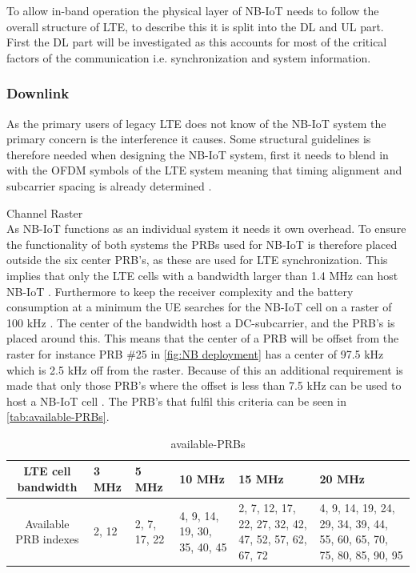 To allow in-band operation the physical layer of \gls{NB-IoT} needs to follow the overall structure of \gls{LTE}, to describe this it is split into the \gls{DL} and \gls{UL} part. First the \gls{DL} part will be investigated as this accounts for most of the critical factors of the communication i.e. synchronization and system information. 

\subsubsection{Downlink}
As the primary users of legacy \gls{LTE} does not know of the \gls{NB-IoT} system the primary concern is the interference it causes. Some structural guidelines is therefore needed when designing the \gls{NB-IoT} system, first it needs to blend in with the \gls{OFDM} symbols of the \gls{LTE} system meaning that timing alignment and subcarrier spacing is already determined \citep[ch. 7.2]{NB-IoT_Book}. 

Channel Raster\\
As \gls{NB-IoT} functions as an individual system it needs it own overhead. To ensure the functionality of both systems the \gls{PRB}s used for \gls{NB-IoT} is therefore placed outside the six center \gls{PRB}'s, as these are used for LTE synchronization. This implies that only the LTE cells with a bandwidth larger than 1.4 MHz can host NB-IoT \citep{whitepaper}. Furthermore to keep the receiver complexity and the battery consumption at a minimum the \gls{UE} searches for the \gls{NB-IoT} cell on a raster of 100 kHz \citep[ch. 7.2]{NB-IoT_Book}. The center of the bandwidth host a DC-subcarrier, and the \gls{PRB}'s is placed around this. This means that the center of a PRB will be offset from the raster for instance PRB \#25 in \autoref{fig:NB deployment} has a center of 97.5 kHz which is 2.5 kHz off from the raster. Because of this an additional requirement is made that only those \gls{PRB}'s where the offset is less than 7.5 kHz can be used to host a NB-IoT cell \citep{primer}. The PRB's that fulfil this criteria can be seen in \autoref{tab:available-PRBs}. 

\begin{table}[H]
\centering
\begin{tabular}{|c|p{1.8cm}|p{1.8cm}|p{1.8cm}|p{1.8cm}|p{1.8cm}|}\hline
\textbf{LTE cell bandwidth}	& 3 MHz				& 5 MHz	& 10 MHz	& 15 MHz	& 20 MHz \\\hline
Available PRB indexes		& 2, 12	& 2, 7, 17, 22	& 4, 9, 14, 19, 30, 35, 40, 45 & 2, 7, 12, 17, 22, 27, 32, 42, 47, 52, 57, 62, 67, 72 & 4, 9, 14, 19, 24, 29, 34, 39, 44, 55, 60, 65, 70, 75, 80, 85, 90, 95 \\\hline
\end{tabular}
\caption{available-PRBs \citep{whitepaper}}
\label{tab:available-PRBs}
\end{table}


